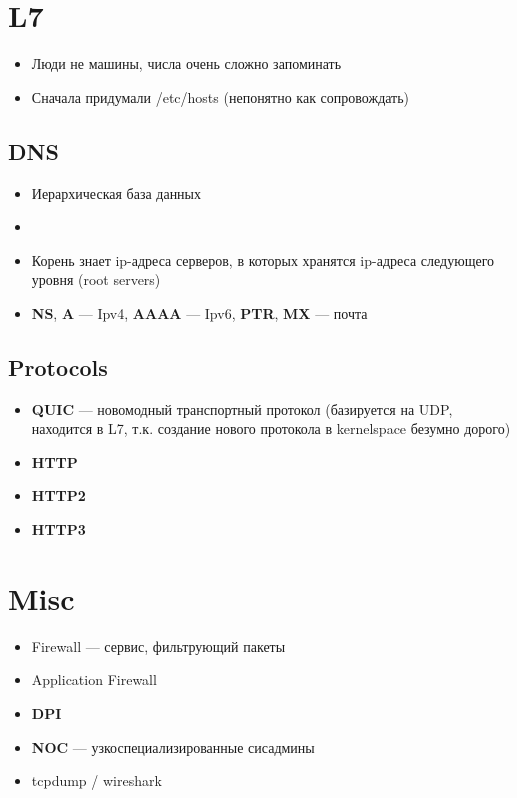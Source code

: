 \documentclass[../../lectures.tex]{subfiles}
\begin{document}
\newpage
\section{L7}
\begin{itemize}
    \item Люди не машины, числа очень сложно запоминать
    \item Сначала придумали /etc/hosts (непонятно как сопровождать)
\end{itemize}

\subsection{DNS}
\begin{itemize}
    \item Иерархическая база данных
    \item {}
    \item Корень знает ip-адреса серверов, в которых хранятся ip-адреса следующего уровня (root servers)
    \item \textbf{NS}, \textbf{A} --- Ipv4, \textbf{AAAA} --- Ipv6, \textbf{PTR}, \textbf{MX} --- почта
\end{itemize}

\subsection{Protocols}
\begin{itemize}
    \item \textbf{QUIC} --- новомодный транспортный протокол (базируется на UDP, находится в L7, т.к. создание нового протокола в kernelspace безумно дорого)
    \item \textbf{HTTP}
    \item \textbf{HTTP2}
    \item \textbf{HTTP3}
\end{itemize}

\section{Misc}
\begin{itemize}
    \item Firewall --- сервис, фильтрующий пакеты
    \item Application Firewall
    \item \textbf{DPI}
    \item \textbf{NOC} --- узкоспециализированные сисадмины
    \item tcpdump / wireshark
\end{itemize}
\end{document}

